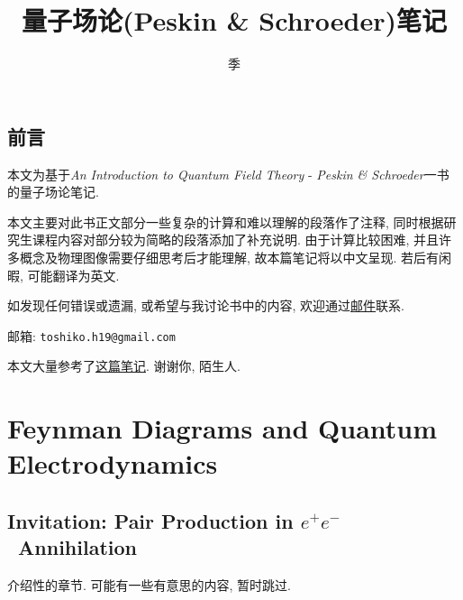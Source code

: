 \documentclass[10pt,b5paper,openany]{book}
\title{量子场论(Peskin \& Schroeder)笔记}
\author{季}
\begin{document}


\tableofcontents




\clearpage %
\chapter*{前言} %

本文为基于\textit{An Introduction to Quantum Field Theory} - \textit{Peskin \& Schroeder}一书的量子场论笔记. 

本文主要对此书正文部分一些复杂的计算和难以理解的段落作了注释, 同时根据研究生课程内容对部分较为简略的段落添加了补充说明. 由于计算比较困难, 并且许多概念及物理图像需要仔细思考后才能理解, 故本篇笔记将以中文呈现. 若后有闲暇, 可能翻译为英文. 

如发现任何错误或遗漏, 或希望与我讨论书中的内容, 欢迎通过\href{mailto:toshiko.h19@gmail.com}{邮件}联系. 

邮箱: \texttt{toshiko.h19@gmail.com}

本文大量参考了\href{http://gamebm.shoutwiki.com/wiki/Lecture_Notes_of_An_Introduction_to_Quantum_Field_Theory_by_M._Peskin_and_D._Schroeder}{这篇笔记}. 谢谢你, 陌生人. 

\clearpage

\part{Feynman Diagrams and Quantum Electrodynamics}

\clearpage

\chapter{Invitation: Pair Production in \texorpdfstring{$e^+e^-$}\ \ Annihilation}

介绍性的章节. 可能有一些有意思的内容, 暂时跳过. 
\end{document}
